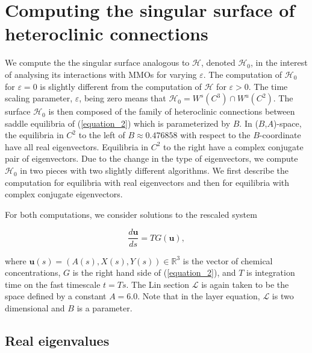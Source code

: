 \documentclass{ws-ijbc}
\begin{document}

\section{Computing the singular surface of heteroclinic connections}

We compute the the singular surface analogous to $\mathscr{H}$, denoted $\mathscr{H}_0$, in the interest of analysing its interactions with MMOs for varying $\varepsilon$.  The computation of $\mathscr{H}_0$ for $\varepsilon=0$ is slightly different from the computation of $\mathscr{H}$ for $\varepsilon > 0$.  The time scaling parameter, $\varepsilon$, being zero means that $\mathscr{H}_0 = W^s(C^3) \cap W^u(C^2)$.  The surface $\mathscr{H}_0$ is then composed of the family of heteroclinic connections between saddle equilibria of (\ref{equation_2}) which is parameterized by $B$.  In ($B$,$A$)-space, the equilibria in $C^2$ to the left of $B \approx 0.476858$ with respect to the $B$-coordinate have all real eigenvectors.  Equilibria in $C^2$ to the right have a complex conjugate pair of eigenvectors.  Due to the change in the type of eigenvectors, we compute $\mathscr{H}_0$ in two pieces with two slightly different algorithms.  We first describe the computation for equilibria with real eigenvectors and then for equilibria with complex conjugate eigenvectors.  

For both computations, we consider solutions to the rescaled system

\begin{equation}
\frac{d\mathbf{u}}{ds} = TG(\mathbf{u}),
\label{fast_rescale}
\end{equation}

\noindent
where $\mathbf{u}(s) = (A(s), X(s), Y(s)) \in \mathbb{R}^3$ is the vector of chemical concentrations, $G$ is the right hand side of (\ref{equation_2}), and $T$ is integration time on the fast timescale $t=Ts$.  The Lin section $\mathscr{L}$ is again taken to be the space defined by a constant $A=6.0$.  Note that in the layer equation, $\mathscr{L}$ is two dimensional and $B$ is a parameter.

\subsection{Real eigenvalues}
\end{document}

